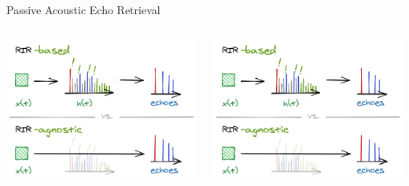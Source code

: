 \begin{frame}[t]{\alert{Passive} Acoustic Echo Retrieval \hfill\faPalette}
        \vspace{.5em}
        \begin{columns}[onlytextwidth] %
            \begin{column}{.48\textwidth}
                \includegraphics[trim={0 31em 0 7em},clip,width=.9\textwidth]{./figures/based-agnostic.png}
            \end{column}
            \begin{column}{.48\textwidth}
                \includegraphics[trim={0 0 0 40em},clip,width=.9\textwidth]{./figures/based-agnostic.png}
            \end{column}%
        \end{columns}


\end{frame}
